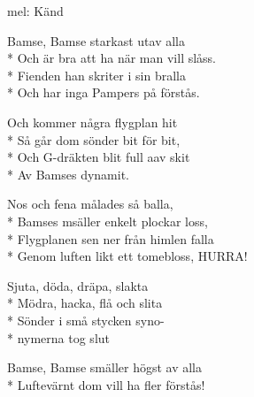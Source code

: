 \begin{SongText}[Bamsevisan]
    \begin{SongInfo}
        mel: Känd
    \end{SongInfo}
    \begin{SongVerse}
        Bamse, Bamse starkast utav alla\\*%
        Och är bra att ha när man vill slåss.\\*%
        Fienden han skriter i sin bralla\\*%
        Och har inga Pampers på förstås.
    \end{SongVerse}
    \begin{SongVerse}
        Och kommer några flygplan hit\\*%
        Så går dom sönder bit för bit,\\*%
        Och G-dräkten blit full aav skit\\*%
        Av Bamses dynamit.
    \end{SongVerse}
    \begin{SongVerse}
        Nos och fena målades så balla,\\*%
        Bamses msäller enkelt plockar loss,\\*%
        Flygplanen sen ner från himlen falla\\*%
        Genom luften likt ett tomebloss, HURRA!
    \end{SongVerse}
    \begin{SongVerse}
        Sjuta, döda, dräpa, slakta\\*%
        Mödra, hacka, flå och slita\\*%
        Sönder i små stycken syno-\\*%
        nymerna tog slut
    \end{SongVerse}
    \begin{SongVerse}
        Bamse, Bamse smäller högst av alla\\*%
        Luftevärnt dom vill ha fler förstås!
    \end{SongVerse}
\end{SongText}
